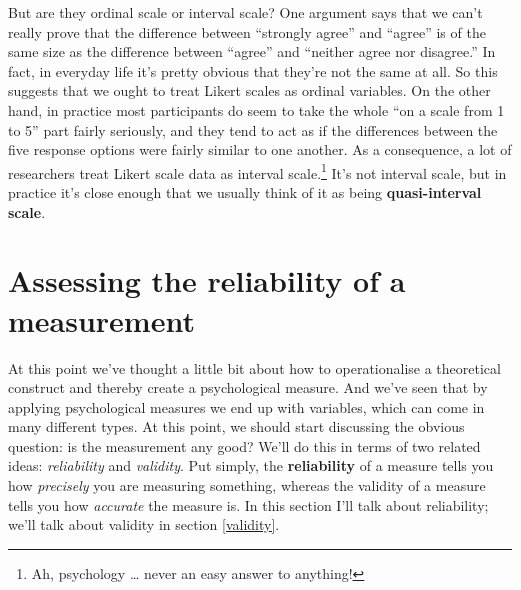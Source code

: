 \documentclass[
]{book}
\begin{document}
But are they ordinal scale or interval scale? One argument says that we can't really prove that the difference between ``strongly agree'' and ``agree'' is of the same size as the difference between ``agree'' and ``neither agree nor disagree.'' In fact, in everyday life it's pretty obvious that they're not the same at all. So this suggests that we ought to treat Likert scales as ordinal variables. On the other hand, in practice most participants do seem to take the whole ``on a scale from 1 to 5'' part fairly seriously, and they tend to act as if the differences between the five response options were fairly similar to one another. As a consequence, a lot of researchers treat Likert scale data as interval scale.\footnote{Ah, psychology \ldots{} never an easy answer to anything!} It's not interval scale, but in practice it's close enough that we usually think of it as being {\textbf{quasi-interval scale}}.

\hypertarget{reliability}{%
\section{Assessing the reliability of a measurement}\label{reliability}}

At this point we've thought a little bit about how to operationalise a theoretical construct and thereby create a psychological measure. And we've seen that by applying psychological measures we end up with variables, which can come in many different types. At this point, we should start discussing the obvious question: is the measurement any good? We'll do this in terms of two related ideas: \emph{reliability} and \emph{validity}. Put simply, the {\textbf{reliability}} of a measure tells you how \emph{precisely} you are measuring something, whereas the validity of a measure tells you how \emph{accurate} the measure is. In this section I'll talk about reliability; we'll talk about validity in section \ref{validity}.
\end{document}
